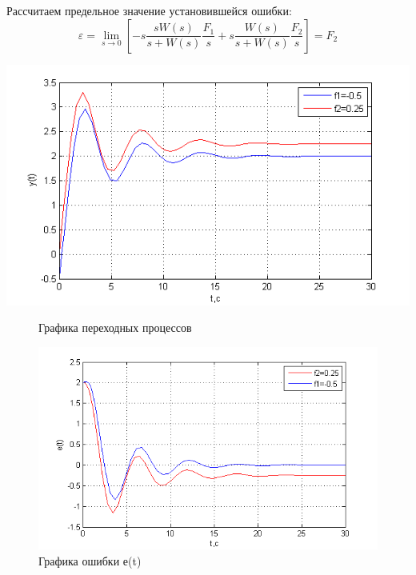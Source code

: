 \documentclass[a4paper, 11pt]{article}
\begin{document}
Рассчитаем предельное значение установившейся ошибки:
\[\varepsilon  = \mathop {\lim }\limits_{s \to 0} [ - s\frac{{sW(s)}}{{s + W(s)}}\frac{{{F_1}}}{s} + s\frac{{W(s)}}{{s + W(s)}}\frac{{{F_2}}}{s}] = {F_2}\]

\begin{center}
	\includegraphics[width=0.7\linewidth]{10}
	\begin{figure}[h]
		\centering
		
		\caption{Графика переходных процессов}
		\label{fig:10}
	\end{figure}
\end{center}

\begin{figure}[h]
	\centering
	\includegraphics[width=0.7\linewidth]{13}
	\caption{Графика ошибки е(t)}
	\label{fig:13}
\end{figure}
\end{document}
